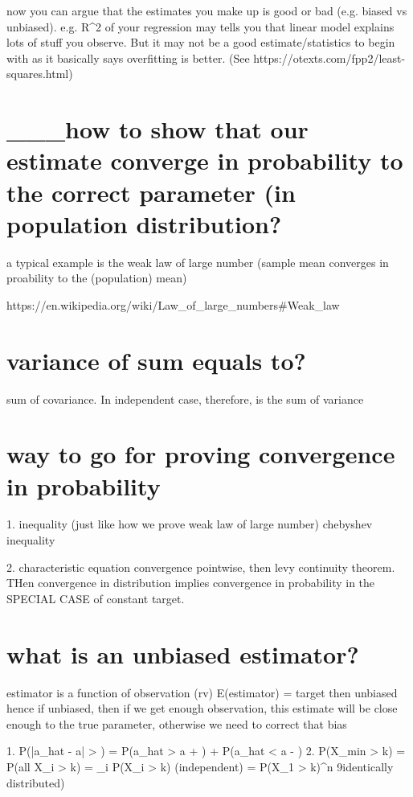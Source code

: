 {{{{{{{{{{now you can argue that the estimates you make up is good or bad (e.g. biased vs unbiased). e.g. R^2 of your regression may tells you that linear model explains lots of stuff you observe. But it may not be a good estimate/statistics to begin with as it basically says overfitting is better. (See https://otexts.com/fpp2/least-squares.html)


\section*{___how to show that our estimate converge in probability to the correct parameter (in population distribution?}

a typical example is the weak law of large number (sample mean converges in proability to the (population) mean)

https://en.wikipedia.org/wiki/Law_of_large_numbers#Weak_law



\section*{variance of sum equals to?}
sum of covariance. In independent case, therefore, is the sum of variance



\section*{way to go for proving convergence in probability}
1. inequality (just like how we prove weak law of large number)
	chebyshev inequality
	
2. characteristic equation convergence pointwise, then levy continuity theorem. THen convergence in distribution implies convergence in probability in the SPECIAL CASE of constant target.


\section*{what is an unbiased estimator?}
estimator is a function of observation (rv)
E(estimator) = target then unbiased
hence if unbiased, then if we get enough observation, this estimate will be close enough to the true parameter, otherwise we need to correct that bias




1. P(|a_hat - a| > \epsilon) = P(a_hat > a + \epsilon) + P(a_hat < a - \epsilon)
2. P(X_min > k) = P(all X_i > k) 
= \prod_i P(X_i > k)			(independent)
= P(X_1 > k)^n 					9identically distributed)

}}}}}}}}}}
